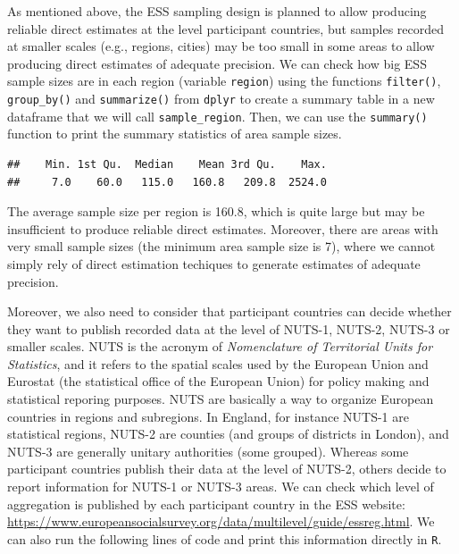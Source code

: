 \documentclass[
]{article}
\newenvironment{Shaded}{\begin{snugshade}}{\end{snugshade}}
\newcommand{\CommentTok}[1]{\textcolor[rgb]{0.56,0.35,0.01}{\textit{#1}}}
\newcommand{\DataTypeTok}[1]{\textcolor[rgb]{0.13,0.29,0.53}{#1}}
\newcommand{\DecValTok}[1]{\textcolor[rgb]{0.00,0.00,0.81}{#1}}
\newcommand{\KeywordTok}[1]{\textcolor[rgb]{0.13,0.29,0.53}{\textbf{#1}}}
\newcommand{\NormalTok}[1]{#1}
\newcommand{\OperatorTok}[1]{\textcolor[rgb]{0.81,0.36,0.00}{\textbf{#1}}}
\newcommand{\StringTok}[1]{\textcolor[rgb]{0.31,0.60,0.02}{#1}}
\begin{document}
As mentioned above, the ESS sampling design is planned to allow
producing reliable direct estimates at the level participant countries,
but samples recorded at smaller scales (e.g., regions, cities) may be
too small in some areas to allow producing direct estimates of adequate
precision. We can check how big ESS sample sizes are in each region
(variable \texttt{region}) using the functions \texttt{filter()},
\texttt{group\_by()} and \texttt{summarize()} from \texttt{dplyr} to
create a summary table in a new dataframe that we will call
\texttt{sample\_region}. Then, we can use the \texttt{summary()}
function to print the summary statistics of area sample sizes.

\begin{Shaded}
\end{Shaded}

\begin{verbatim}
##    Min. 1st Qu.  Median    Mean 3rd Qu.    Max. 
##     7.0    60.0   115.0   160.8   209.8  2524.0
\end{verbatim}

The average sample size per region is 160.8, which is quite large but
may be insufficient to produce reliable direct estimates. Moreover,
there are areas with very small sample sizes (the minimum area sample
size is 7), where we cannot simply rely of direct estimation techiques
to generate estimates of adequate precision.

Moreover, we also need to consider that participant countries can decide
whether they want to publish recorded data at the level of NUTS-1,
NUTS-2, NUTS-3 or smaller scales. NUTS is the acronym of
\emph{Nomenclature of Territorial Units for Statistics}, and it refers
to the spatial scales used by the European Union and Eurostat (the
statistical office of the European Union) for policy making and
statistical reporing purposes. NUTS are basically a way to organize
European countries in regions and subregions. In England, for instance
NUTS-1 are statistical regions, NUTS-2 are counties (and groups of
districts in London), and NUTS-3 are generally unitary authorities (some
grouped). Whereas some participant countries publish their data at the
level of NUTS-2, others decide to report information for NUTS-1 or
NUTS-3 areas. We can check which level of aggregation is published by
each participant country in the ESS website:
\url{https://www.europeansocialsurvey.org/data/multilevel/guide/essreg.html}.
We can also run the following lines of code and print this information
directly in \texttt{R}.
\end{document}
